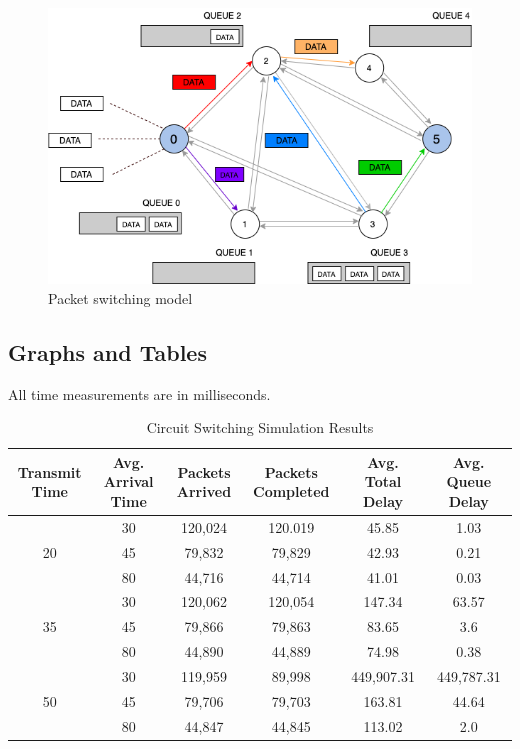 \documentclass{article}
\begin{document}
  \begin{figure}[H]
    \centering
    \includegraphics[totalheight=8cm]{images/graph_ps.png}
    \renewcommand\figurename{Figure}
    \caption{Packet switching model}
    \label{fig:graph_ps}
  \end{figure}
  
  \subsection{Graphs and Tables}

  All time measurements are in milliseconds.

  \begin{table}[h]
    \caption{Circuit Switching Simulation Results}
    \centering
    {\footnotesize
      \begin{tabular}{|c|c|c|c|c|c|}
        \hline
        Transmit Time & Avg. Arrival Time & Packets Arrived & Packets Completed & Avg. Total Delay
        & Avg. Queue Delay\\  
        \hline

        \multirow{3}{*}{20} & 30 & 120,024 & 120.019 & 45.85 & 1.03\\
        \cline{2-6}
        & 45 & 79,832 & 79,829 & 42.93 & 0.21\\
        \cline{2-6}
        & 80 & 44,716 & 44,714 & 41.01 & 0.03\\
        \hline

        \multirow{3}{*}{35} & 30 & 120,062 & 120,054 & 147.34 & 63.57\\
        \cline{2-6}
        & 45 & 79,866 & 79,863 & 83.65 & 3.6\\
        \cline{2-6}
        & 80 & 44,890 & 44,889 & 74.98 & 0.38\\
        \hline

        \multirow{3}{*}{50} & 30 & 119,959 & 89,998 & 449,907.31 & 449,787.31\\
        \cline{2-6}
        & 45 & 79,706 & 79,703 & 163.81 & 44.64\\
        \cline{2-6}
        & 80 & 44,847 & 44,845 & 113.02 & 2.0\\
        \hline
      \end{tabular}
    }
  \end{table}
\end{document}
